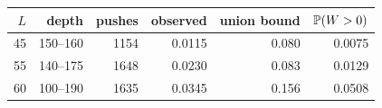 \begin{tabular}{@{}rrrrrr@{}}
\toprule
$L$ & depth & pushes & observed & union bound & $\mathbb{P}(W>0)$ \\
\midrule
45 & 150--160 & 1154 & 0.0115 & 0.080 & 0.0075 \\
55 & 140--175 & 1648 & 0.0230 & 0.083 & 0.0129 \\
60 & 100--190 & 1635 & 0.0345 & 0.156 & 0.0508 \\
\bottomrule
\end{tabular}

